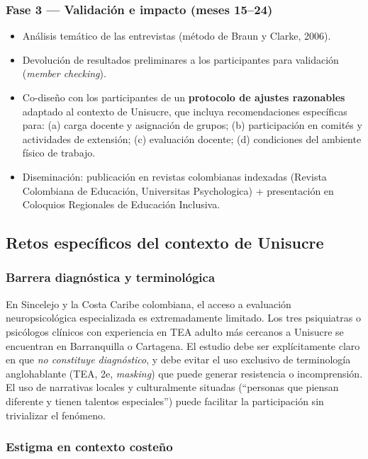 \subsubsection{Fase 3 — Validación e impacto (meses 15--24)}

\begin{itemize}[leftmargin=*, itemsep=2pt]
    \item Análisis temático de las entrevistas (método de Braun y Clarke, 2006).
    \item Devolución de resultados preliminares a los participantes para validación
    (\textit{member checking}).
    \item Co-diseño con los participantes de un \textbf{protocolo de ajustes
    razonables} adaptado al contexto de Unisucre, que incluya recomendaciones
    específicas para: (a) carga docente y asignación de grupos; (b) participación
    en comités y actividades de extensión; (c) evaluación docente; (d) condiciones
    del ambiente físico de trabajo.
    \item Diseminación: publicación en revistas colombianas indexadas (Revista
    Colombiana de Educación, Universitas Psychologica) + presentación en Coloquios
    Regionales de Educación Inclusiva.
\end{itemize}

\subsection{Retos específicos del contexto de Unisucre}

\subsubsection{Barrera diagnóstica y terminológica}

En Sincelejo y la Costa Caribe colombiana, el acceso a evaluación neuropsicológica
especializada es extremadamente limitado. Los tres psiquiatras o psicólogos
clínicos con experiencia en TEA adulto más cercanos a Unisucre se encuentran en
Barranquilla o Cartagena. El estudio debe ser explícitamente claro en que \textit{no
constituye diagnóstico}, y debe evitar el uso exclusivo de terminología
anglohablante (TEA, 2e, \textit{masking}) que puede generar resistencia o
incomprensión. El uso de narrativas locales y culturalmente situadas
(``personas que piensan diferente y tienen talentos especiales'') puede
facilitar la participación sin trivializar el fenómeno.

\subsubsection{Estigma en contexto costeño}

